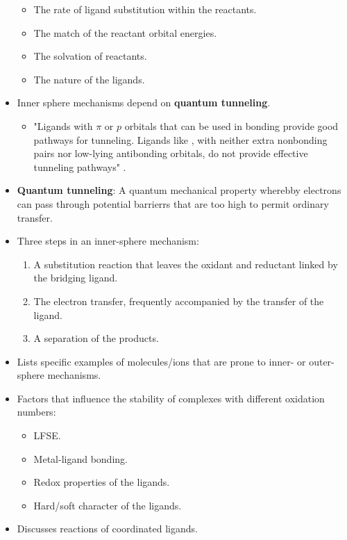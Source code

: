 \documentclass[../notes.tex]{subfiles}
\begin{document}
\begin{itemize}
    \begin{itemize}
        \item The rate of ligand substitution within the reactants.
        \item The match of the reactant orbital energies.
        \item The solvation of reactants.
        \item The nature of the ligands.
    \end{itemize}
    \item Inner sphere mechanisms depend on \textbf{quantum tunneling}.
    \begin{itemize}
        \item "Ligands with $\pi$ or $p$ orbitals that can be used in bonding provide good pathways for tunneling. Ligands like , with neither extra nonbonding pairs nor low-lying antibonding orbitals, do not provide effective tunneling pathways" \parencite[463]{bib:MiesslerFischerTarr}.
    \end{itemize}
    \item \textbf{Quantum tunneling}: A quantum mechanical property wherebby electrons can pass through potential barrierrs that are too high to permit ordinary transfer.
    \item Three steps in an inner-sphere mechanism:
    \begin{enumerate}
        \item A substitution reaction that leaves the oxidant and reductant linked by the bridging ligand.
        \item The electron transfer, frequently accompanied by the transfer of the ligand.
        \item A separation of the products.
    \end{enumerate}
    \item Lists specific examples of molecules/ions that are prone to inner- or outer-sphere mechanisms.
    \item Factors that influence the stability of complexes with different oxidation numbers:
    \begin{itemize}
        \item LFSE.
        \item Metal-ligand bonding.
        \item Redox properties of the ligands.
        \item Hard/soft character of the ligands.
    \end{itemize}
    \item Discusses reactions of coordinated ligands.
\end{itemize}
\end{document}
